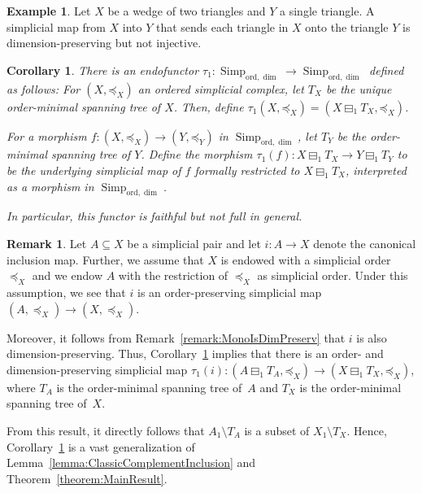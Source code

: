 \documentclass[oneside]{amsart}
\newtheorem{corollary}[theorem]{Corollary}
\theoremstyle{definition}
\newtheorem{example}[theorem]{Example}
\newtheorem{remark}[theorem]{Remark}
\newcommand\ord{\mathrm{ord}}
\newcommand\Simp{\operatorname{Simp}}
\begin{document}
\begin{example}
    Let $X$ be a wedge of two triangles and $Y$ a single triangle.
    A simplicial map from $X$ into $Y$ that sends each triangle in $X$ onto the triangle $Y$ is dimension-preserving but not injective.
\end{example}

\begin{corollary}%
    \label{corollary:EndoFunc}
    There is an endofunctor $\tau_1\colon \Simp_{\ord, \dim} \to \Simp_{\ord, \dim}$ defined as follows:
    For $(X, \mathord\preceq_X)$ an ordered simplicial complex, let $T_X$ be the unique order-minimal spanning tree of $X$.
    Then, define $\tau_1(X, \mathord\preceq_X) = (X \boxminus_1 T_X, \mathord\preceq_X)$.

    For a morphism $f\colon (X, \mathord\preceq_X) \to (Y, \mathord\preceq_Y)$ in $\Simp_{\ord, \dim}$, let $T_Y$ be the order-minimal spanning tree of $Y$.
    Define the morphism $\tau_1(f)\colon X \boxminus_1 T_X \to Y \boxminus_1 T_Y$ to be the underlying simplicial map of $f$ formally restricted to $X \boxminus_1 T_X$, interpreted as a morphism in $\Simp_{\ord, \dim}$.

    In particular, this functor is faithful but not full in general.
\end{corollary}

\begin{remark}
    Let $A \subseteq X$ be a simplicial pair and let $i\colon A \to X$ denote the canonical inclusion map.
    Further, we assume that $X$ is endowed with a simplicial order~$\preceq_X$ and we endow $A$ with the restriction of $\preceq_X$ as simplicial order.
    Under this assumption, we see that $i$ is an order-preserving simplicial map $(A, \preceq_X) \to (X, \preceq_X)$.
    
    Moreover, it follows from Remark~\ref{remark:MonoIsDimPreserv} that $i$ is also dimension-preserving.
    Thus, Corollary~\ref{corollary:EndoFunc} implies that there is an order- and dimension-preserving simplicial map $\tau_1(i)\colon (A \boxminus_1 T_A, \mathord\preceq_X) \to (X \boxminus_1 T_X, \mathord\preceq_X)$, where $T_A$ is the order-minimal spanning tree of~$A$ and $T_X$ is the order-minimal spanning tree of~$X$.

    From this result, it directly follows that $A_1 \setminus T_A$ is a subset of $X_1 \setminus T_X$.
    Hence, Corollary~\ref{corollary:EndoFunc} is a vast generalization of Lemma~\ref{lemma:ClassicComplementInclusion} and Theorem~\ref{theorem:MainResult}.
\end{remark}
\end{document}
